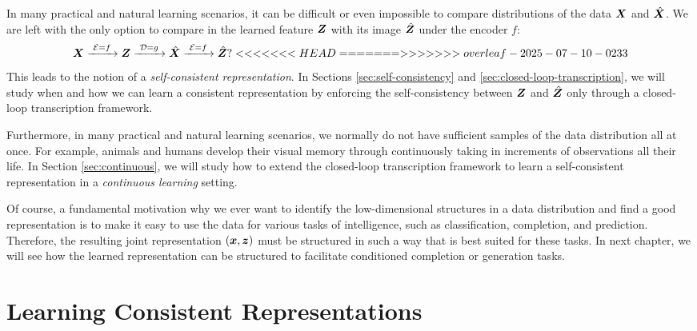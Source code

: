 \documentclass[\toplevelprefix/book-main.tex]{subfiles}
\begin{document}
In many practical and natural learning scenarios, it can be difficult or even impossible to compare distributions of the data $\bm{X}$ and $\hat {\bm{X}}$. We are left with the only option to compare in the learned feature $\bm{Z}$ with its image $\hat {\bm{Z}}$ under the encoder $f$: 
\begin{equation}
 \bm{X}
\xrightarrow{\hspace{1mm} \mathcal{E} = f \hspace{1mm}} \bm{Z}  \xrightarrow{\hspace{1mm} \mathcal{D} = g \hspace{1mm}} \hat{\bm{X}} \xrightarrow{\hspace{1mm} \mathcal{E} = f \hspace{1mm}} \hat {\bm{Z}}?
<<<<<<< HEAD
=======
>>>>>>> overleaf-2025-07-10-0233
\end{equation}
This leads to the notion of a {\em self-consistent representation}. In Sections \ref{sec:self-consistency} and \ref{sec:closed-loop-transcription}, we will study when and how we can learn a consistent representation by enforcing the self-consistency between $\bm{Z}$ and $\hat {\bm{Z}}$ only through a closed-loop transcription framework. 

Furthermore, in many practical and natural learning scenarios, we normally do not have sufficient samples of the data distribution all at once. For example, animals and humans develop their visual memory through continuously taking in increments of observations all their life. In Section \ref{sec:continuous}, we will study how to extend the closed-loop transcription framework to learn a self-consistent representation in a  {\em continuous learning} setting.

Of course, a fundamental motivation why we ever want to identify the
low-dimensional structures in a data distribution and find a good
representation is to make it easy to use the data for various tasks
of intelligence, such as classification, completion, and prediction.
Therefore, the resulting joint representation $(\bm{x}, \bm{z})$ must be
structured in such a way that is best suited for these tasks. In
next chapter, we will
see how the learned representation can be structured to facilitate
conditioned completion or generation tasks.

\section{Learning Consistent Representations}\label{sec:consistent-representation}
\end{document}
